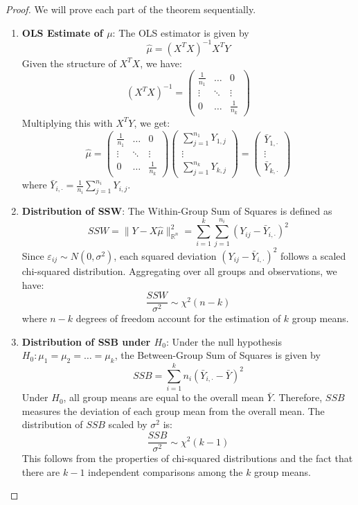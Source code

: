 \documentclass[open=any, 11pt,paper=A4]{scrreprt}
\begin{document}
\begin{proof}
We will prove each part of the theorem sequentially.

\begin{enumerate}
    \item \textbf{OLS Estimate of $\mu$}: The OLS estimator is given by
    \[
    \hat{\mu} = (X^T X)^{-1} X^T Y
    \]
    Given the structure of $X^T X$, we have:
    \[
    (X^T X)^{-1} = \begin{pmatrix}
        \frac{1}{n_1} & \dots & 0 \\
        \vdots & \ddots & \vdots \\
        0 & \dots & \frac{1}{n_k}
    \end{pmatrix}
    \]
    Multiplying this with $X^T Y$, we get:
    \[
    \hat{\mu} = \begin{pmatrix}
        \frac{1}{n_1} & \dots & 0 \\
        \vdots & \ddots & \vdots \\
        0 & \dots & \frac{1}{n_k}
    \end{pmatrix}
    \begin{pmatrix}
        \sum_{j=1}^{n_1} Y_{1,j} \\
        \vdots \\
        \sum_{j=1}^{n_k} Y_{k,j}
    \end{pmatrix}
    = \begin{pmatrix}
        \bar{Y}_{1,\cdot} \\
        \vdots \\
        \bar{Y}_{k,\cdot}
    \end{pmatrix}
    \]
    where $\bar{Y}_{i,\cdot} = \frac{1}{n_i} \sum_{j=1}^{n_i} Y_{i,j}$.
    
    \item \textbf{Distribution of SSW}: The Within-Group Sum of Squares is defined as
    \[
    SSW = \|Y - X\hat{\mu}\|^2_{\mathbb{R}^n} = \sum_{i=1}^k \sum_{j=1}^{n_i} \left(Y_{ij} - \bar{Y}_{i,\cdot}\right)^2
    \]
    Since $\varepsilon_{ij} \sim N(0, \sigma^2)$, each squared deviation $\left(Y_{ij} - \bar{Y}_{i,\cdot}\right)^2$ follows a scaled chi-squared distribution. Aggregating over all groups and observations, we have:
    \[
    \frac{SSW}{\sigma^2} \sim \chi^2(n - k)
    \]
    where $n - k$ degrees of freedom account for the estimation of $k$ group means.
    
    \item \textbf{Distribution of SSB under $H_0$}: Under the null hypothesis $H_0: \mu_1 = \mu_2 = \dots = \mu_k$, the Between-Group Sum of Squares is given by
    \[
    SSB = \sum_{i=1}^k n_i \left(\bar{Y}_{i,\cdot} - \bar{Y}\right)^2
    \]
    Under $H_0$, all group means are equal to the overall mean $\bar{Y}$. Therefore, $SSB$ measures the deviation of each group mean from the overall mean. The distribution of $SSB$ scaled by $\sigma^2$ is:
    \[
    \frac{SSB}{\sigma^2} \sim \chi^2(k - 1)
    \]
    This follows from the properties of chi-squared distributions and the fact that there are $k - 1$ independent comparisons among the $k$ group means.
    

\end{enumerate}
\end{proof}
\end{document}
